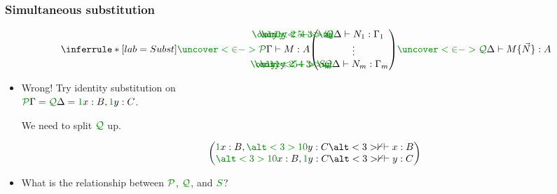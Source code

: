 \documentclass[fleqn]{beamer}
\begin{document}
\begin{frame}
  \frametitle{Simultaneous substitution}
    \[
      \inferrule*[lab=Subst]
      {\ctx{\Gamma}{\uncover<2->{P}} \vdash M : A
        \\ {\begin{pmatrix}
            \phantom{S_1}\rescomment{\mathllap{\only<2-3>{\resctx Q}}\mathllap{\only<4>{\wn}}\mathllap{\only<5->{S_1}}}\Delta
            \vdash N_1 : \Gamma_1 \\
            \vdots \\
            \phantom{S_m}\rescomment{\mathllap{\only<2-3>{\resctx Q}}\mathllap{\only<4>{\wn}}\mathllap{\only<5->{S_m}}}\Delta
            \vdash N_m : \Gamma_m
          \end{pmatrix}}}
      {\ctx{\Delta}{\uncover<2->{Q}} \vdash M\{\vec N\} : A}
    \]
  \begin{itemize}
  \item<3->
    \begin{minipage}[t]{\linewidth}
      \begin{overprint}
        Wrong! Try identity substitution on \\
        $\ctx{\Gamma}{P} = \ctx{\Delta}{Q} = \ctxvar{x}{B}{1}, \ctxvar{y}{C}{1}$.

        We need to split $\resctx{Q}$ up.
      \end{overprint}
      \[
        \begin{pmatrix}
          \ctxvar{x}{B}{1}, \ctxvar{y}{C}{\alt<3>{1}{0}} \alt<3>\nvdash\vdash x
          : B \\
          \ctxvar{x}{B}{\alt<3>{1}{0}}, \ctxvar{y}{C}{1} \alt<3>\nvdash\vdash y
          : C
        \end{pmatrix}
      \]
    \end{minipage}
  \item<5->
    What is the relationship between $\resctx P$, $\resctx Q$, and
    $\rescomment{S}$?
  \end{itemize}
\end{frame}
\end{document}

